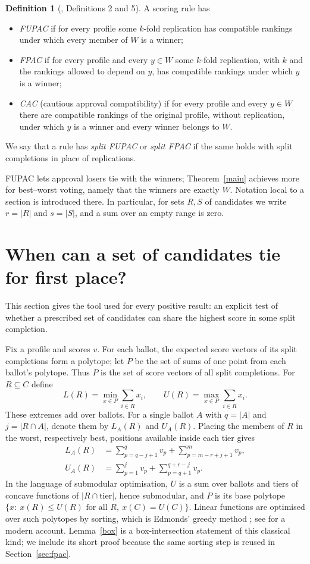 \documentclass[11pt,a4paper]{article}
\theoremstyle{definition}
\newtheorem{definition}[theorem]{Definition}
\theoremstyle{remark}
\begin{document}
\begin{definition}[\cite{tlz}, Definitions 2 and 5]\label{def}
A scoring rule has
\begin{itemize}[nosep]
\item \emph{FUPAC} if for every profile some $k$-fold replication has compatible rankings under which every member of $W$ is a winner;
\item \emph{FPAC} if for every profile and every $y\in W$ some $k$-fold replication, with $k$ and the rankings allowed to depend on $y$, has compatible rankings under which $y$ is a winner;
\item \emph{CAC} (cautious approval compatibility) if for every profile and every $y\in W$ there are compatible rankings of the original profile, without replication, under which $y$ is a winner and every winner belongs to $W$.
\end{itemize}
We say that a rule has \emph{split FUPAC} or \emph{split FPAC} if the same holds with split completions in place of replications.
\end{definition}

FUPAC lets approval losers tie with the winners; Theorem~\ref{main} achieves more for best--worst voting, namely that the winners are exactly $W$. Notation local to a section is introduced there. In particular, for sets $R,S$ of candidates we write $r=|R|$ and $s=|S|$, and a sum over an empty range is zero.

\section{When can a set of candidates tie for first place?}\label{sec:interval}
This section gives the tool used for every positive result: an explicit test of whether a prescribed set of candidates can share the highest score in some split completion.

Fix a profile and scores $v$. For each ballot, the expected score vectors of its split completions form a polytope; let $P$ be the set of sums of one point from each ballot's polytope. Thus $P$ is the set of score vectors of all split completions. For $R\subseteq C$ define
\[
 L(R)=\min_{x\in P}\sum_{i\in R}x_i,\qquad U(R)=\max_{x\in P}\sum_{i\in R}x_i .
\]
These extremes add over ballots. For a single ballot $A$ with $q=|A|$ and $j=|R\cap A|$, denote them by $L_A(R)$ and $U_A(R)$. Placing the members of $R$ in the worst, respectively best, positions available inside each tier gives
\begin{align*}
 L_A(R)&=\sum_{p=q-j+1}^{q} v_p+\sum_{p=m-r+j+1}^{m}v_p,\\
 U_A(R)&=\sum_{p=1}^{j}v_p+\sum_{p=q+1}^{q+r-j}v_p .
\end{align*}
In the language of submodular optimisation, $U$ is a sum over ballots and tiers of concave functions of $|R\cap\text{tier}|$, hence submodular, and $P$ is its base polytope $\{x:\ x(R)\le U(R)\text{ for all }R,\ x(C)=U(C)\}$. Linear functions are optimised over such polytopes by sorting, which is Edmonds' greedy method \cite{edmonds}; see \cite[Section~44.2]{schrijver} for a modern account. Lemma~\ref{box} is a box-intersection statement of this classical kind; we include its short proof because the same sorting step is reused in Section~\ref{sec:fpac}.
\end{document}
